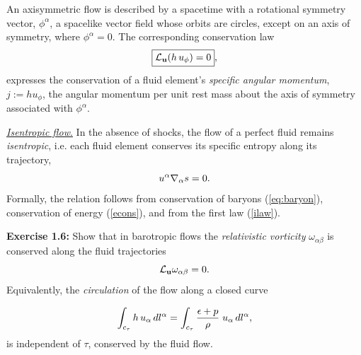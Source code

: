 \documentclass[12pt]{article}
\def\be{\begin{equation}}
\def\ee{\end{equation}}
\newcommand{\na}{\nabla}
\begin{document}
\vskip0.8cm

  An axisymmetric flow is described
by
a spacetime with a rotational symmetry vector, $\phi^\alpha$, a 
spacelike
vector field whose orbits are circles, except on an axis of symmetry, where 
$\phi^\alpha=0$.
The corresponding conservation law
\be
\boxed{ {\cal L}_{\bf u} (h\,u_\phi) = 0},
\label{amcons}
\ee
expresses the conservation of a fluid element's {\it specific angular
momentum}, $j:= hu_\phi$, the angular momentum per unit rest mass about the axis of 
symmetry associated with $\phi^\alpha$. 


\label{bernoullii}

\vskip0.8cm

\noindent\uline{{\it Isentropic flow}.}  In the absence of shocks, the flow of
a perfect fluid remains {\it isentropic}, i.e. each fluid element
conserves its specific entropy along its trajectory, 
\be
        u^\alpha\na_\alpha s=0.
\index{isentropic flow|textbf}
\label{scons}\ee
Formally, the relation follows from conservation of baryons (\ref{eq:baryon}), 
conservation of energy (\ref{econs}), and from the first law (\ref{ilaw}). 

\vskip0.5cm

\textbf{Exercise 1.6:} Show that in barotropic flows the {\it relativistic vorticity} $\omega_{\alpha\beta}$ is conserved along the fluid trajectories 
\be
{\cal L}_{\bf u} \omega_{\alpha\beta} = 0.  
\label{vortii}
\index{vorticity!conservation}\ee
Equivalently, the {\it circulation} of the flow along a closed curve

\be
\int_{c_\tau} h\,u_\alpha\, d l^\alpha=\int_{c_\tau} {{\epsilon +
p}\over
\rho}\;u_\alpha\,
d l^\alpha, \label{vortiv}
\ee
is independent of $\tau$, conserved by the fluid flow.

\vskip0.8cm



\vskip0.8cm
\end{document}
